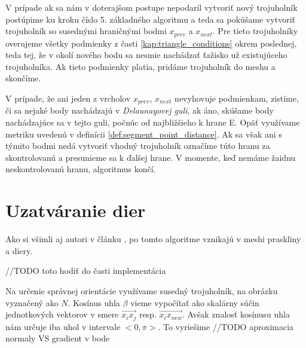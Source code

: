 V prípade ak sa nám v doterajšom postupe nepodaril vytvoriť nový trojuholník postúpime ku kroku 
číslo 5. základného algoritmu a teda sa pokúšame vytvoriť trojuholník so susednými hraničnými bodmi 
$x_{prev}$ a $x_{next}$. Pre tieto trojuholníky overujeme všetky podmienky z časti 
\ref{kap:triangle_conditions} okrem poslednej, teda tej, že v okolí nového bodu sa nesmie 
nachádzať ťažisko už existujúceho trojuholníka. Ak tieto podmienky platia, pridáme trojuholník 
do meshu a skončíme.

V prípade, že ani jeden z vrcholov $x_{prev}$, $x_{next}$ nevyhovuje podmienkam, zistíme, 
či sa nejaké body nachádzajú v \textit{Delaunayovej guli}, ak áno, skúšame body nachádzajúce
sa v tejto guli, počnúc od najbližšieho k hrane E. Opäť využívame metriku uvedenú v definícii 
\ref{def:segment_point_distance}. Ak sa však ani s týmito bodmi nedá vytvoriť vhodný trojuholník
označíme túto hranu za skontrolovanú a presunieme sa k ďalšej hrane. V momente, keď nemáme žaidnu 
neskontrolovanú hranu, algoritmus končí.

\section{Uzatváranie dier}

Ako si všimli aj autori v článku \cite{akkouche2001adaptive}, po tomto algoritme vznikajú v meshi 
praskliny a diery.

    //TODO toto hodiť do časti implementácia
    
    Na určenie správnej orientácie využívame susedný trojuholník, na obrázku vyznačený 
    ako $N$. Kosínus uhla $\beta$ vieme vypočítať ako skalárny súčin jednotkových vektorov 
    v smere $\overrightarrow{x_i x_j}$ resp. $\overrightarrow{x_i x_{new}}$. 
    Avšak znalosť kosínusu uhla nám určuje iba uhol v intervale $<0, \pi>$. To vyriešime 
//TODO aproximacia normaly VS gradient v bode